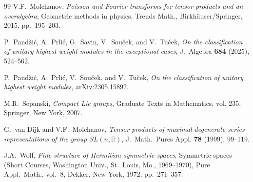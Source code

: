 \documentclass[reqno,11pt]{amsart}
\theoremstyle{remark}
\numberwithin{equation}{section}
\newcommand{\R}{\mathbb{R}}
\begin{document}
\begin{thebibliography}{99}
V.F.~Molchanov, \emph{{Poisson and Fourier transforms for tensor products and
  an overalgebra}}, Geometric methods in physics, Trends Math.,
  Birkh\"auser/Springer, 2015, pp.~195--203.

P.~Pand{\v z}i{\' c}, A.~Prli{\' c}, G.~Savin, V.~Sou{\v c}ek, and V.~Tu{\v
  c}ek, \emph{{On the classification of unitary highest weight modules in the
  exceptional cases}}, J.\ Algebra \textbf{684} (2025), 524--562.

P.~Pand{\v z}i{\' c}, A.~Prli{\' c}, V.~Sou{\v c}ek, and V.~Tu{\v c}ek,
  \emph{{On the classification of unitary highest weight modules}},
  arXiv:2305.15892.

M.R.~Sepanski, \emph{{Compact Lie groups}}, Graduate Texts in Mathematics, vol.
  235, Springer, New York, 2007.

G.~van Dijk and V.F.~Molchanov, \emph{{Tensor products of maximal degenerate
  series representations of the group $SL(n,\R)$}}, J.\ Math.\ Pures Appl.
  \textbf{78} (1999), 99--119.

J.A.~Wolf, \emph{{Fine structure of Hermitian symmetric spaces}}, Symmetric
  spaces (Short Courses, Washington Univ., St.\ Louis, Mo., 1969--1970), Pure
  Appl.\ Math., vol.~8, Dekker, New York, 1972, pp.~271--357.

\end{thebibliography}




\end{document}
